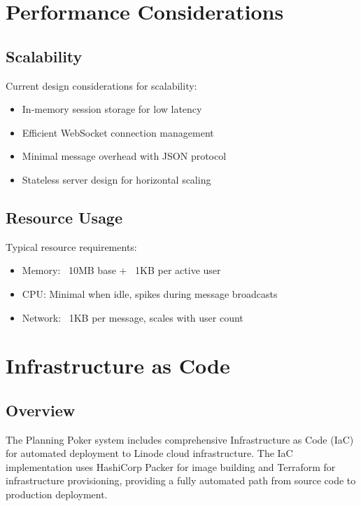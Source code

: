 \documentclass[11pt,a4paper]{article}
\begin{document}
\section{Performance Considerations}

\subsection{Scalability}

Current design considerations for scalability:

\begin{itemize}
    \item In-memory session storage for low latency
    \item Efficient WebSocket connection management
    \item Minimal message overhead with JSON protocol
    \item Stateless server design for horizontal scaling
\end{itemize}

\subsection{Resource Usage}

Typical resource requirements:

\begin{itemize}
    \item Memory: ~10MB base + ~1KB per active user
    \item CPU: Minimal when idle, spikes during message broadcasts
    \item Network: ~1KB per message, scales with user count
\end{itemize}

\section{Infrastructure as Code}

\subsection{Overview}

The Planning Poker system includes comprehensive Infrastructure as Code (IaC) for automated deployment to Linode cloud infrastructure. The IaC implementation uses HashiCorp Packer for image building and Terraform for infrastructure provisioning, providing a fully automated path from source code to production deployment.
\end{document}
